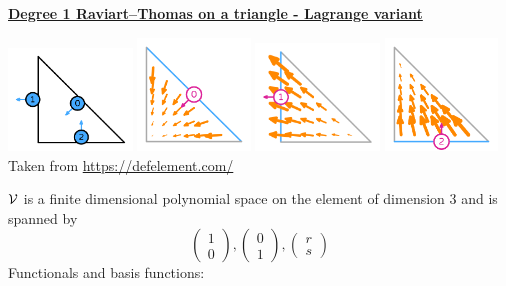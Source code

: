 \vspace{.5cm}
\noindent
\underline{\bf Degree 1 Raviart–Thomas on a triangle - Lagrange variant}

\begin{center}
\includegraphics[width=3.3cm]{images/pair_raviart-thomas/element-Raviart-Thomas-variant-equispaced-triangle-1-dofs-large}
\includegraphics[width=3cm]{images/pair_raviart-thomas/element-Raviart-Thomas-variant-equispaced-triangle-1-0-large}
\includegraphics[width=3.3cm]{images/pair_raviart-thomas/element-Raviart-Thomas-variant-equispaced-triangle-1-1-large}
\includegraphics[width=3cm]{images/pair_raviart-thomas/element-Raviart-Thomas-variant-equispaced-triangle-1-2-large}\\
{\captionfont Taken from \url{https://defelement.com/}}
\end{center}

${\cal V}$ is a finite dimensional polynomial space on the element of dimension $3$ and is spanned by 
\[
\left( \begin{array}{c} 1 \\ 0  \end{array} \right),
\left( \begin{array}{c} 0 \\ 1  \end{array} \right),
\left( \begin{array}{c} r \\ s  \end{array} \right)
\]
Functionals and basis functions:

